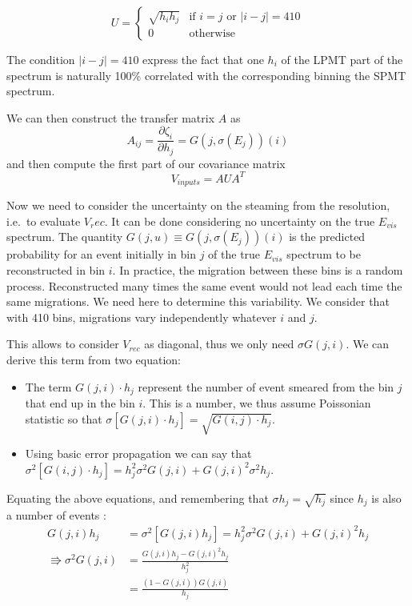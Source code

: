 \documentclass[../main.tex]{subfiles}
\begin{document}
\begin{equation}
  U = \begin{cases}
    \sqrt{h_ih_j}& \text{if } i = j \text { or } |i - j| = 410 \\
    0& \text{otherwise}
  \end{cases}
\end{equation}

The condition $|i - j| = 410$ express the fact that one $h_i$ of the LPMT part of the spectrum is naturally 100\% correlated with the corresponding binning the SPMT spectrum.

We can then construct the transfer matrix $A$ as
\begin{equation}
  A_{ij} = \frac{\partial\zeta_i}{\partial h_j} = G(j, \sigma(E_j))(i)
\end{equation}
and then compute the first part of our covariance matrix
\begin{equation}
  V_{inputs} = A U A^T
\end{equation}

Now we need to consider the uncertainty on the steaming from the resolution, i.e.\ to evaluate $V_rec$. It can be done considering no uncertainty on the true $E_{vis}$ spectrum.
The quantity $G(j,u) \equiv G(j,\sigma(E_j))(i)$ is the predicted probability for an event initially in bin $j$ of the true $E_{vis}$ spectrum to be reconstructed in bin $i$. In practice, the migration between these bins is a random process. Reconstructed many times the same event would not lead each time the same migrations. We need here to determine this variability. We consider that with 410 bins, migrations vary independently whatever $i$ and $j$.

This allows to consider $V_{rec}$ as diagonal, thus we only need $\sigma G(j,i)$.
We can derive this term from two equation:
\begin{itemize}
  \item The term $G(j, i) \cdot h_j$ represent the number of event smeared from the bin $j$ that end up in the bin $i$. This is a number, we thus assume Poissonian statistic so that $\sigma[G(j, i) \cdot h_j] = \sqrt{G(i, j) \cdot h_j}$.
  \item Using basic error propagation we can say that $\sigma^2[G(i, j) \cdot h_j] = h_j^2 \sigma^2G(j, i) + G(j, i)^2 \sigma^2 h_j$.
\end{itemize}
Equating the above equations, and remembering that $\sigma h_j=\sqrt{h_j}$ since $h_j$ is also a number of events :
\begin{align}
  G(j, i) h_j &= \sigma^2[G(j, i)h_j] =h_j^2 \sigma^2G(j, i) + G(j, i)^2 h_j \\
  \Rrightarrow \sigma^2 G(j, i) &= \frac{G(j, i) h_j - G(j, i)^2 h_j}{h_j^2} \\
                                &= \frac{(1 - G(j, i))G(j, i)}{h_j}
\end{align}
\end{document}
